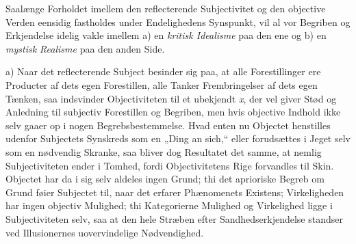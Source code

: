 \documentclass[12pt]{book}
\newcommand{\opage}[1]{\marginnote{\footnotesize\textit{[#1]}}}
\begin{document}
Saalænge Forholdet imellem den reflecterende Subjectivitet og den objective Verden
eensidig fastholdes under Endelighedens Synspunkt, vil al vor Begriben og Erkjendelse
idelig vakle imellem a) en \emph{kritisk Idealisme} paa den ene og b) en \emph{mystisk
Realisme} paa den anden Side.

a) Naar det reflecterende Subject besinder sig paa, at alle Forestillinger ere
Producter af dets egen Forestillen, alle Tanker Frembringelser af dets egen Tænken, saa
indsvinder Objectiviteten til et ubekjendt \textit{x}, der vel giver Stød og Anledning
til subjectiv Forestillen og Begriben, men hvis objective Indhold ikke selv gaaer op i
nogen Begrebsbestemmelse. Hvad enten nu Objectet henstilles udenfor Subjectets
Synskreds som en „Ding an sich,“ eller forudsættes i Jeget selv som en nødvendig
Skranke, saa bliver dog Resultatet det samme, at nemlig Subjectiviteten ender i Tomhed,
fordi Objectivitetens Rige forvandles til Skin. Objectet har da i sig selv aldeles ingen
Grund; thi det aprioriske Begreb om Grund føier Subjectet til, naar det erfarer
Phænomenets Existens; Virkeligheden har ingen objectiv Mulighed; thi Kategorierne
Mulighed og Virkelighed ligge i Subjectiviteten selv, saa at
\opage{206} %
%
%
%
den hele Stræben efter Sandhedserkjendelse standser ved Illusionernes uovervindelige
Nødvendighed.
\end{document}
